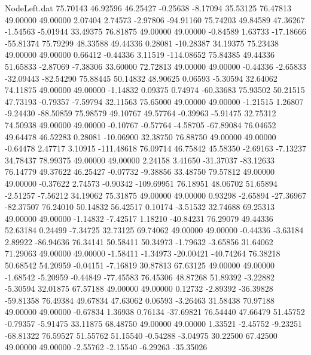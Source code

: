 \begin{filecontents}{NodeLeft.dat}
  75.70143   46.92596   46.25427    -0.25638   -8.17094   35.53125   76.47813   49.00000   49.00000    2.07404    2.74573   -2.97806  -94.91160
  75.74203   49.84589   47.36267    -1.54563   -5.01944   33.49375   76.81875   49.00000   49.00000   -0.84589    1.63733  -17.18666  -55.81374
  75.79299   48.33588   49.44336     0.28081  -10.28387   34.19375   75.23438   49.00000   49.00000    0.66412   -0.44336    3.11519 -114.08652
  75.84385   49.44336   51.65833    -2.87069   -7.38306   33.60000   72.72813   49.00000   49.00000   -0.44336   -2.65833  -32.09443  -82.54290
  75.88445   50.14832   48.90625     0.06593   -5.30594   32.64062   74.11875   49.00000   49.00000   -1.14832    0.09375    0.74974  -60.33683
  75.93502   50.21515   47.73193    -0.79357   -7.59794   32.11563   75.65000   49.00000   49.00000   -1.21515    1.26807   -9.24430  -88.50859
  75.98579   49.10767   49.57764    -0.39963   -5.91475   32.75312   74.50938   49.00000   49.00000   -0.10767   -0.57764   -4.58705  -67.89084
  76.04652   49.64478   46.52283     0.28081  -10.06900   32.38750   76.88750   49.00000   49.00000   -0.64478    2.47717    3.10915 -111.48618
  76.09714   46.75842   45.58350    -2.69163   -7.13237   34.78437   78.99375   49.00000   49.00000    2.24158    3.41650  -31.37037  -83.12633
  76.14779   49.37622   46.25427    -0.07732   -9.38856   33.48750   79.57812   49.00000   49.00000   -0.37622    2.74573   -0.90342 -109.69951
  76.18951   48.06702   51.65894    -2.51257   -7.56212   34.19062   75.31875   49.00000   49.00000    0.93298   -2.65894  -27.36967  -82.37507
  76.24010   50.14832   56.42517     0.10174   -3.51532   32.74688   69.25313   49.00000   49.00000   -1.14832   -7.42517    1.18210  -40.84231
  76.29079   49.44336   52.63184     0.24499   -7.34725   32.73125   69.74062   49.00000   49.00000   -0.44336   -3.63184    2.89922  -86.94636
  76.34141   50.58411   50.34973    -1.79632   -3.65856   31.64062   71.29063   49.00000   49.00000   -1.58411   -1.34973  -20.00421  -40.74264
  76.38218   50.68542   54.20959    -0.04151   -7.16819   30.87813   67.63125   49.00000   49.00000   -1.68542   -5.20959   -0.44849  -77.45583
  76.45306   48.87268   51.89392    -3.22882   -5.30594   32.01875   67.57188   49.00000   49.00000    0.12732   -2.89392  -36.39828  -59.81358
  76.49384   49.67834   47.63062     0.06593   -3.26463   31.58438   70.97188   49.00000   49.00000   -0.67834    1.36938    0.76134  -37.69821
  76.54440   47.66479   51.45752    -0.79357   -5.91475   33.11875   68.48750   49.00000   49.00000    1.33521   -2.45752   -9.23251  -68.81322
  76.59527   51.55762   51.15540    -0.54288   -3.04975   30.22500   67.42500   49.00000   49.00000   -2.55762   -2.15540   -6.29263  -35.35026

\end{filecontents}
